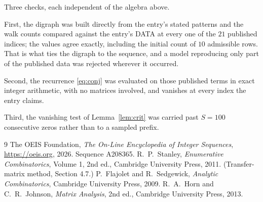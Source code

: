 \documentclass[11pt,a4paper]{article}
\theoremstyle{plain}
\theoremstyle{definition}
\begin{document}
Three checks, each independent of the algebra above.

First, the digraph was built directly from the entry's stated patterns and the walk counts
compared against the entry's DATA at every one of the $21$ published indices; the
values agree exactly, including the initial count of $10$ admissible rows. That is
what ties the digraph to the sequence, and a model reproducing only part of the published
data was rejected wherever it occurred.

Second, the recurrence \eqref{eq:conj} was evaluated on those published terms in exact
integer arithmetic, with no matrices involved, and vanishes at every index the entry claims.

Third, the vanishing test of Lemma~\ref{lem:crit} was carried past $S=100$ consecutive
zeros rather than to a sampled prefix.

\begin{thebibliography}{9}
 The OEIS Foundation, \emph{The On-Line Encyclopedia of Integer
Sequences}, \url{https://oeis.org}, 2026. Sequence A208365.
 R.~P.~Stanley, \emph{Enumerative Combinatorics}, Volume 1, 2nd ed.,
Cambridge University Press, 2011. (Transfer-matrix method, Section 4.7.)
 P.~Flajolet and R.~Sedgewick, \emph{Analytic Combinatorics}, Cambridge
University Press, 2009.
 R.~A.~Horn and C.~R.~Johnson, \emph{Matrix Analysis}, 2nd ed., Cambridge
University Press, 2013.
\end{thebibliography}
\end{document}
